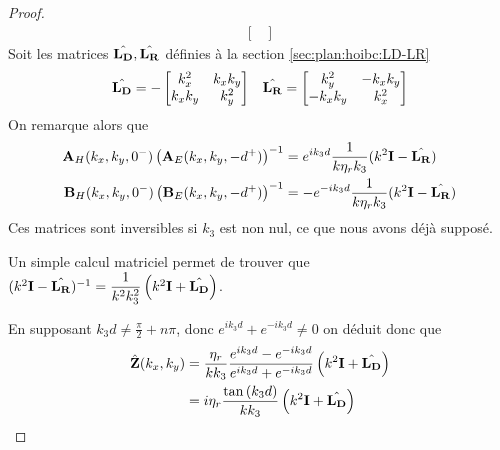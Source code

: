 \begin{proof}
\begin{align*}
\begin{bmatrix}
                \end{bmatrix} 
            \end{align*}
            Soit les matrices \(\hat{\mathbf{L_D}},\hat{\mathbf{L_R}}\) définies à la section \ref{sec:plan:hoibc:LD-LR}
            \begin{align*}
                \hat{\mathbf{L_D}} = -\begin{bmatrix}
                k_x^2 & k_x k_y
                \\
                k_x k _y & k_y^2
                \end{bmatrix}
                & & 
                \hat{\mathbf{L_R}} = \begin{bmatrix}
                k_y^2 & -k_x k_y
                \\
                -k_x k _y &  k_x^2
                \end{bmatrix}
            \end{align*}
            On remarque alors que 
            \begin{align*}
                \mathbf{A}_H(k_x,k_y,0^-)\left(\mathbf{A}_E(k_x,k_y,-d^+)\right)^{-1} &=  e^{ik_3d}\dfrac{1}{k\eta_r k_3}(k^2\mathbf{I}  -\hat{\mathbf{L_R}})
                \\
                \mathbf{B}_H(k_x,k_y,0^-)\left(\mathbf{B}_E(k_x,k_y,-d^+)\right)^{-1} &= -e^{-ik_3d}\dfrac{1}{k\eta_r k_3}(k^2\mathbf{I}  -\hat{\mathbf{L_R}})
            \end{align*}
            Ces matrices sont inversibles si \(k_3\) est non nul, ce que nous avons déjà supposé.

            Un simple calcul matriciel permet de trouver que \( (k^2\mathbf{I} - \hat{\mathbf{L_R}})^{-1} = \dfrac{1}{k^2k_3^2}\left(k^2 \mathbf{I} + \hat{\mathbf{L_D}}\right) \).

            En supposant \(k_3d \not = \frac{\pi}{2} + n\pi\), donc \(e^{ik_3d}+e^{-ik_3d}\not=0\) on déduit donc que
            \begin{align*}
                \hat {\mathbf{Z}}(k_x,k_y) &= \dfrac{\eta_r}{k k_3} \dfrac{e^{ik_3d} - e^{-ik_3d}}{e^{ik_3d} + e^{-ik_3d}}\left(k^2\mathbf{I} + \hat{\mathbf{L_D}}\right)
                \\
                &= i\eta_r\dfrac{\tan\left(k_3d\right)}{k k_3}\left(k^2\mathbf{I} + \hat{\mathbf{L_D}}\right)
            \end{align*}
        \end{proof}
